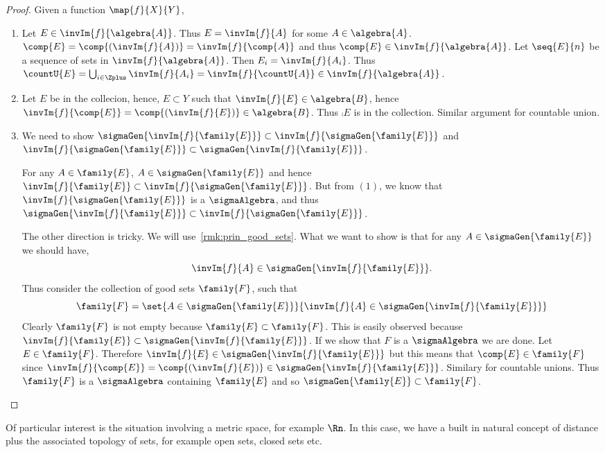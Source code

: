 \begin{proof}
    Given a function $\map{f}{X}{Y}$, 
    \begin{enumerate}
	\item Let $E \in \invIm{f}{\algebra{A}}$. Thus $E = \invIm{f}{A}$ for some $A \in
	    \algebra{A}$. $\comp{E} = \comp{(\invIm{f}{A})} = \invIm{f}{\comp{A}}$ and 
	    thus $\comp{E}\in\invIm{f}{\algebra{A}}$. Let $\seq{E}{n}$ be a sequence of sets in
	    $\invIm{f}{\algebra{A}}$. Then $E_i = \invIm{f}{A_i}$. Thus $\countU{E} =
	    \bigcup_{i\in\Zplus}\invIm{f}{A_i} = \invIm{f}{\countU{A}} \in \invIm{f}{\algebra{A}}$.
	\item Let $E$ be in the collecion, hence, $E \subset Y$ such that $\invIm{f}{E} \in 
	    \algebra{B}$, hence $\invIm{f}{\comp{E}} = \comp{(\invIm{f}{E})} \in \algebra{B}$. 
	    Thus $\comp{E}$ is in the collection. Similar argument for countable union.
	\item
	    We need to show $\sigmaGen{\invIm{f}{\family{E}}} \subset 
	    \invIm{f}{\sigmaGen{\family{E}}}$ and $ \invIm{f}{\sigmaGen{\family{E}}} \subset 
	    \sigmaGen{\invIm{f}{\family{E}}}$.
	    
	    For any $A \in \family{E}$, $A \in \sigmaGen{\family{E}}$ and hence
	    $\invIm{f}{\family{E}} \subset \invIm{f}{\sigmaGen{\family{E}}}$. But from
	    $(1)$, we know that $\invIm{f}{\sigmaGen{\family{E}}}$ is a $\sigmaAlgebra$, and
	    thus $\sigmaGen{\invIm{f}{\family{E}}} \subset
	    \invIm{f}{\sigmaGen{\family{E}}}$.

	    The other direction is tricky. We will use~\ref{rmk:prin_good_sets}. What we want to show
	    is that for any $A \in \sigmaGen{\family{E}}$ we should have,
	    \begin{equation*}
		\invIm{f}{A} \in \sigmaGen{\invIm{f}{\family{E}}}.
	    \end{equation*}
	    Thus consider the collection of good sets $\family{F}$, such that
	    \begin{equation*}
		\family{F} = \set{A \in \sigmaGen{\family{E}}}{\invIm{f}{A} \in 
		    \sigmaGen{\invIm{f}{\family{E}}}}
	    \end{equation*}
	    Clearly $\family{F}$ is not empty because $\family{E} \subset \family{F}$. This
	    is easily observed because $\invIm{f}{\family{E}} \subset
	    \sigmaGen{\invIm{f}{\family{E}}}$. If we show that $F$ is a $\sigmaAlgebra$ we
	    are done.
	    Let $E\in \family{F}$. Therefore $\invIm{f}{E} \in
	    \sigmaGen{\invIm{f}{\family{E}}}$ but
	    this means that $\comp{E} \in \family{F}$ since $\invIm{f}{\comp{E}} =
	    \comp{(\invIm{f}{E})} \in \sigmaGen{\invIm{f}{\family{E}}}$. Similary for 
	    countable unions. Thus $\family{F}$ is a $\sigmaAlgebra$ containing $\family{E}$ 
	    and so $\sigmaGen{\family{E}} \subset \family{F}$.
    \end{enumerate}
\end{proof}
Of particular interest is the situation involving a metric space, for example $\Rn$. In this case,
we have a built in natural concept of distance plus the associated topology of sets, for example 
open sets, closed sets etc.

